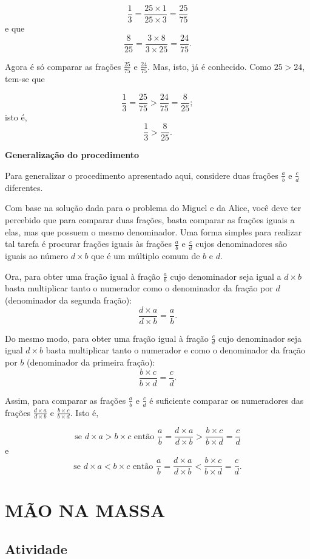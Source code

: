 $$\dfrac{1}{3} = \dfrac{25 \times 1}{25 \times 3} = \dfrac{25}{75}$$
e que
$$\dfrac{8}{25} = \dfrac{3 \times 8}{3 \times 25} = \dfrac{24}{75}.$$

Agora é só comparar as frações $\frac{25}{75}$ e $\frac{24}{75}$. Mas, isto, já é conhecido.
Como $25 > 24$, tem-se que

$$\dfrac{1}{3} = \dfrac{25}{75} > \dfrac{24}{75} =  \dfrac{8}{25};$$
isto é,
$$\dfrac{1}{3} > \dfrac{8}{25}.$$

{\bf Generalização do procedimento}

Para generalizar o procedimento apresentado aqui, considere duas frações $\frac{a}{b}$ e $\frac{c}{d}$ diferentes.

Com base na solução dada para o problema do Miguel e da Alice, você deve ter percebido que para comparar duas frações, basta comparar as frações iguais a elas, mas que possuem o mesmo denominador. Uma forma simples para realizar tal tarefa é procurar frações iguais às frações  $\frac{a}{b}$ e $\frac{c}{d}$ cujos denominadores são iguais ao número $d\times b$ que é um múltiplo comum de $b$ e $d$.

Ora, para obter uma fração igual à fração $\frac{a}{b}$ cujo denominador seja igual a $d\times b$ basta multiplicar tanto o numerador como o denominador da fração por $d$ (denominador da segunda fração):
$$\dfrac{d\times a}{d \times b} =  \dfrac{a}{b}.$$

Do mesmo modo, para obter uma fração igual à fração $\frac{c}{d}$ cujo denominador seja igual $d\times b$ basta multiplicar tanto o numerador e como o denominador da fração por $b$ (denominador da primeira fração):
$$\dfrac{b\times c}{b \times d} =  \dfrac{c}{d}.$$

Assim, para comparar as frações $\frac{a}{b}$ e $\frac{c}{d}$ é suficiente comparar os numeradores das frações  $\frac{d\times a}{d \times b}$ e $\frac{b\times c}{b \times d}$.
Isto é,

$$\text{se } d\times a > b\times c \text{ então }  \dfrac{a}{b} = \dfrac{d\times a}{d \times b} >\dfrac{b\times c}{b \times d} =  \dfrac{c}{d}$$
e
$$\text{se } d\times a < b\times c \text{ então }  \dfrac{a}{b} = \dfrac{d\times a}{d \times b} < \dfrac{b\times c}{b \times d} =  \dfrac{c}{d}.$$


\section{MÃO NA MASSA }

\subsection{Atividade}

